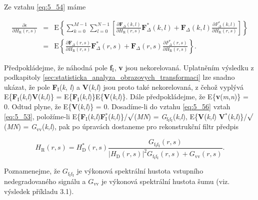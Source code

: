 Ze vztahu \eqref{eq:5_54} máme

\begin{eqnarray} \label{eq:5_56}
    \frac{\partial\epsilon}{\partial H_\mathrm{R}(r, s)} &=& \mathrm{E} \left\{ \sum\limits_{k=0}^{M-1} \sum\limits_{l=0}^{N-1} \left[ \frac{\partial\mathbf{F}_\Delta (k, l)}{\partial H_\mathrm{R}(r, s)} \mathbf{F}_\Delta^* (k, l) + \mathbf{F}_\Delta (k, l) \frac{\partial F_\Delta^*(k, l)}{\partial H_\mathrm{R}(r, s)} \right] \right\} \\
    &=& \mathrm{E} \left\{ \frac{\partial\mathbf{F}_\Delta (r, s)}{\partial H_\mathrm{R}(r, s)} \mathbf{F}_\Delta^* (r, s) + \mathbf{F}_\Delta (r, s) \frac{\partial F_\Delta^*(r, s)}{\partial H_\mathrm{R}(r, s)}\right\}. \nonumber
\end{eqnarray}

Předpokládejme, že náhodná pole \textbf{f}$_\mathrm{I}$, \textbf{v} jsou nekorelovaná. Uplatněním výsledku z podkapitoly \ref{sec:statisticka_analyza_obrazovych_transformaci} lze snadno ukázat, že pole \textbf{F}$_\mathrm{I}$(\textit{k}, \textit{l}) a \textbf{V}(\textit{k},\textit{l}) jsou proto také nekorelovaná, z čehož vyplývá E\{\textbf{F}$_\mathrm{I}$(\textit{k},\textit{l})\textbf{V}(\textit{k},\textit{l})\} = E\{\textbf{F}$_\mathrm{I}$(\textit{k},\textit{l})\}E\{\textbf{V}(\textit{k},\textit{l})\}. Dále předpokládejme, že E\{\textbf{v}(\textit{m},\textit{n})\} = 0. Odtud plyne, že E\{\textbf{V}(\textit{k},\textit{l})\} = 0. Dosadíme-li do vztahu \eqref{eq:5_56} vztah \eqref{eq:5_53}, položíme-li E\{\textbf{F}$_\mathrm{I}$(\textit{k},\textit{l})\textbf{F}$_\mathrm{I}^*$(\textit{k},\textit{l})\}/$\surd$(\textit{MN}) = \textit{G}$_{\mathrm{f}_\mathrm{I} \mathrm{f}_\mathrm{I}}$(\textit{k},\textit{l}), E\{\textbf{V}(\textit{k},\textit{l}) \textbf{V}$^*$(\textit{k},\textit{l})\}/$\surd$(\textit{MN}) = \textit{G}$_{\mathrm{vv}}$(\textit{k},\textit{l}), pak po úpravách dostaneme pro rekonstrukční filtr předpis

\begin{equation} \label{eq:5_57}
    H_\mathrm{R}(r, s) = H_\mathrm{D}^*(r, s) \frac{G_{\mathrm{f}_\mathrm{I} \mathrm{f}_\mathrm{I}}(r, s)}{|H_\mathrm{D}(r, s)|^2 G_{\mathrm{f}_\mathrm{I} \mathrm{f}_\mathrm{I}}(r, s) + G_{\mathrm{vv}}(r, s)}.
\end{equation}

Poznamenejme, že $G_{\mathrm{f}_\mathrm{I} \mathrm{f}_\mathrm{I}}$ je výkonová spektrální hustota vstupního nedegradovaného signálu a $G_{\mathrm{vv}}$ je výkonová spektrální hustota šumu (viz. výsledek příkladu 3.1).

